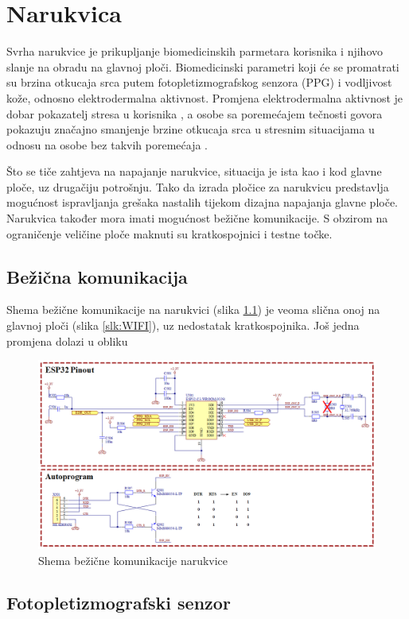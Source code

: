 \chapter{Narukvica}
\label{pog:bracelet}
Svrha narukvice je prikupljanje biomedicinskih parmetara korisnika i njihovo slanje na obradu na glavnoj ploči. Biomedicinski parametri koji će se promatrati su brzina otkucaja srca putem fotopletizmografskog senzora (PPG) i vodljivost kože, odnosno elektrodermalna aktivnost. Promjena elektrodermalna aktivnost je dobar pokazatelj stresa u korisnika \cite{edr}, a osobe sa poremećajem tečnosti govora pokazuju značajno smanjenje brzine otkucaja srca u stresnim situacijama u odnosu na osobe bez takvih poremećaja \cite{ALM2004123}.

Što se tiče zahtjeva na napajanje narukvice, situacija je ista kao i kod glavne ploče, uz drugačiju potrošnju. Tako da izrada pločice za narukvicu predstavlja mogućnost ispravljanja grešaka nastalih tijekom dizajna napajanja glavne ploče. Narukvica također mora imati mogućnost bežične komunikacije. S obzirom na ograničenje veličine ploče maknuti su kratkospojnici i testne točke.

\section{Bežična komunikacija}
Shema bežične komunikacije na narukvici (slika \ref{slk:BR_WIRELESS}) je veoma slična onoj na glavnoj ploči (slika \ref{slk:WIFI}), uz nedostatak kratkospojnika. Još jedna promjena dolazi u obliku %
\begin{figure}
    \centering
    \includegraphics[width=1\textwidth]{Figures/BR_WIRELESS.png}
    \caption{Shema bežične komunikacije narukvice}
    \label{slk:BR_WIRELESS}
\end{figure}

\section{Fotopletizmografski senzor}
